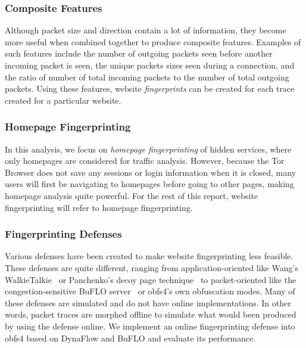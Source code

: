 \documentclass[11pt]{article}
\begin{document}
\subsubsection{Composite Features}
Although packet size and direction contain a lot of information, they become more useful when combined together to produce composite features. Examples of such features include the number of outgoing packets seen before another incoming packet is seen, the unique packets sizes seen during a connection, and the ratio of number of total incoming packets to the number of total outgoing packets. Using these features, website \textit{fingerprints} can be created for each trace created for a particular website.

\subsubsection{Homepage Fingerprinting}
In this analysis, we focus on \textit{homepage fingerprinting} of hidden services, where only homepages are considered for traffic analysis. However, because the Tor Browser does not save any sessions or login information when it is closed, many users will first be navigating to homepages before going to other pages, making homepage analysis quite powerful. For the rest of this report, website fingerprinting will refer to homepage fingerprinting.

\subsubsection{Fingerprinting Defenses}
Various defenses have been created to make website fingerprinting less feasible. These defenses are quite different, ranging from application-oriented like Wang's WalkieTalkie~\cite{walkietalkie} or Panchenko's decoy page technique~\cite{wang} to packet-oriented like the congestion-sensitive BuFLO server~\cite{buflo} or obfs4's own obfuscation modes. Many of these defenses are simulated and do not have online implementations. In other words, packet traces are morphed offline to simulate what would been produced by using the defense online. We implement an online fingerprinting defense into obfs4 based on DynaFlow and BuFLO and evaluate its performance.
\end{document}
